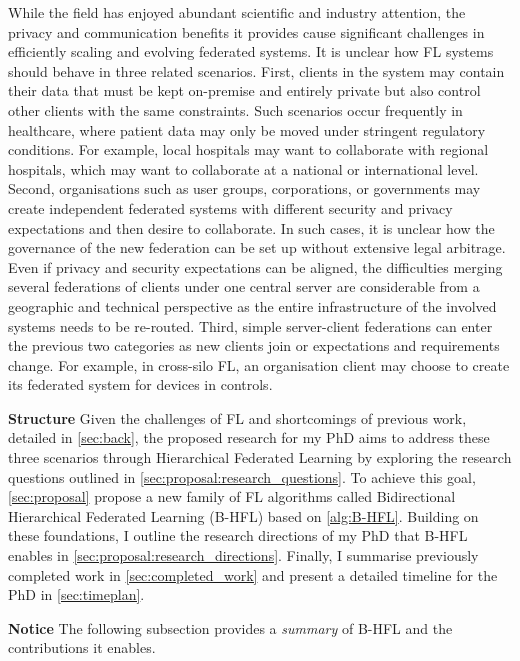 While the field has enjoyed abundant scientific and industry attention, the privacy and communication benefits it provides cause significant challenges in efficiently scaling and evolving federated systems. It is unclear how FL systems should behave in three related scenarios. First, clients in the system may contain their data that must be kept on-premise and entirely private but also control other clients with the same constraints. Such scenarios occur frequently in healthcare, where patient data may only be moved under stringent regulatory conditions. For example, local hospitals may want to collaborate with regional hospitals, which may want to collaborate at a national or international level. Second, organisations such as user groups, corporations, or governments may create independent federated systems with different security and privacy expectations and then desire to collaborate. In such cases, it is unclear how the governance of the new federation can be set up without extensive legal arbitrage. Even if privacy and security expectations can be aligned, the difficulties merging several federations of clients under one central server are considerable from a geographic and technical perspective as the entire infrastructure of the involved systems needs to be re-routed. Third, simple server-client federations can enter the previous two categories as new clients join or expectations and requirements change. For example, in cross-silo FL, an organisation client may choose to create its federated system for devices in controls.


\noindent \textbf{Structure} Given the challenges of FL and shortcomings of previous work, detailed in \cref{sec:back}, the proposed research for my PhD aims to address these three scenarios through Hierarchical Federated Learning by exploring the research questions outlined in \cref{sec:proposal:research_questions}. To achieve this goal, \cref{sec:proposal} propose a new family of FL algorithms called Bidirectional Hierarchical Federated Learning (B-HFL) based on \cref{alg:B-HFL}. Building on these foundations, I outline the research directions of my PhD that B-HFL enables in \cref{sec:proposal:research_directions}. Finally, I summarise previously completed work in \cref{sec:completed_work} and present a detailed timeline for the PhD in \cref{sec:timeplan}.

\noindent \textbf{Notice} The following subsection provides a \emph{summary} of B-HFL and the contributions it enables.
